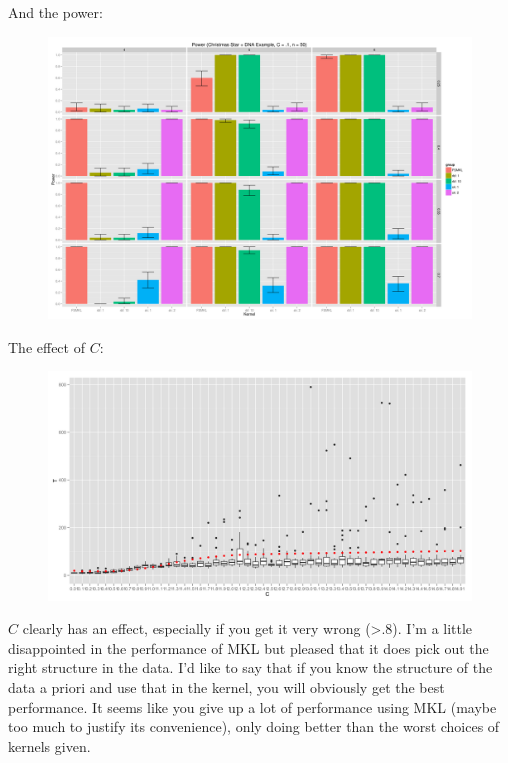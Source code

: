 And the power:
\begin{figure}[!ht]
  \centering
    \includegraphics[scale=.3]{power_christmas_star_DNA_facet4.png}  
\end{figure}

The effect of $C$:
\begin{figure}[!ht]
  \centering
      \includegraphics[scale=.1]{tstat_on_c.png}
\end{figure}

$C$ clearly has an effect, especially if you get it very wrong (>.8).
I'm a little disappointed in the performance of MKL but pleased that
it does pick out the right structure in the data.  I'd like to say
that if you know the structure of the data a priori and use that in
the kernel, you will obviously get the best performance.  It seems
like you give up a lot of performance using MKL (maybe too much to
justify its convenience), only doing better than the worst choices of
kernels given.

